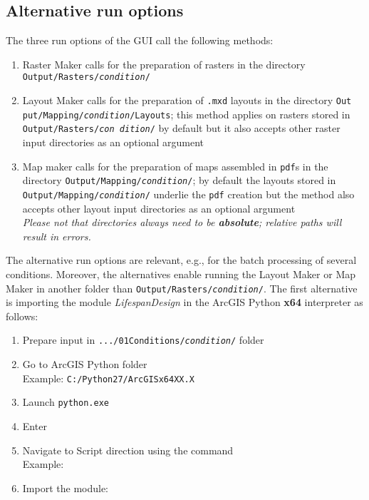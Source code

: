 \subsection{Alternative run options}
\label{sec:lfrun}
The three run options of the GUI call the following methods:
\begin{enumerate}
\item Raster Maker calls  for the preparation of rasters in the directory \texttt{Output/Rasters/\textit{condition}/}
\item Layout Maker calls  for the preparation of \texttt{.mxd} layouts in the directory \texttt{Out put/Mapping/\textit{condition}/Layouts}; this method applies on rasters stored in \texttt{Output/Rasters/\textit{con dition}/} by default but it also accepts other raster input directories as an optional argument
\item Map maker calls  for the preparation of maps assembled in \texttt{pdf}s in the directory \texttt{Output/Mapping/\textit{condition}/}; by default the layouts stored in \texttt{Output/Mapping/\textit{condition}/} underlie the \texttt{pdf} creation but the method also accepts other layout input directories as an optional argument\\
\textit{Please not that directories always need to be \textbf{absolute}; relative paths will result in errors.}
\end{enumerate}

The alternative run options are relevant, e.g., for the batch processing of several conditions. Moreover, the alternatives enable running the Layout Maker or Map Maker in another folder than \texttt{Output/Rasters/\textit{condition}/}. The first alternative is importing the module \textit{LifespanDesign} in the ArcGIS Python \textbf{x64} interpreter as follows:

\begin{enumerate}
	\item Prepare input in \texttt{.../01{\myUnderscore}Conditions/\textit{condition}/} folder
	\item Go to ArcGIS Python folder\\
	Example: \texttt{C:/Python27/ArcGISx64XX.X}
	\item Launch \texttt{python.exe}
	\item Enter 
	\item Navigate to Script direction using the command \\
	Example: 
	\item Import the module: \\
\end{enumerate}

